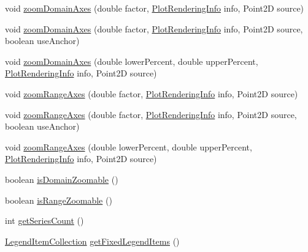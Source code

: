 \begin{DoxyCompactItemize}
\item 
void \mbox{\hyperlink{classorg_1_1jfree_1_1chart_1_1plot_1_1_x_y_plot_ae19a0a54a2ea8a5f86da75f04133eb10}{zoom\+Domain\+Axes}} (double factor, \mbox{\hyperlink{classorg_1_1jfree_1_1chart_1_1plot_1_1_plot_rendering_info}{Plot\+Rendering\+Info}} info, Point2D source)
\item 
void \mbox{\hyperlink{classorg_1_1jfree_1_1chart_1_1plot_1_1_x_y_plot_a68c4a6f62d7e889e17ae696f2e2d24ee}{zoom\+Domain\+Axes}} (double factor, \mbox{\hyperlink{classorg_1_1jfree_1_1chart_1_1plot_1_1_plot_rendering_info}{Plot\+Rendering\+Info}} info, Point2D source, boolean use\+Anchor)
\item 
void \mbox{\hyperlink{classorg_1_1jfree_1_1chart_1_1plot_1_1_x_y_plot_a33fd9493f13695916d80e67997446cdd}{zoom\+Domain\+Axes}} (double lower\+Percent, double upper\+Percent, \mbox{\hyperlink{classorg_1_1jfree_1_1chart_1_1plot_1_1_plot_rendering_info}{Plot\+Rendering\+Info}} info, Point2D source)
\item 
void \mbox{\hyperlink{classorg_1_1jfree_1_1chart_1_1plot_1_1_x_y_plot_abf465c72eede1ebfa6e3f652d2cf3d61}{zoom\+Range\+Axes}} (double factor, \mbox{\hyperlink{classorg_1_1jfree_1_1chart_1_1plot_1_1_plot_rendering_info}{Plot\+Rendering\+Info}} info, Point2D source)
\item 
void \mbox{\hyperlink{classorg_1_1jfree_1_1chart_1_1plot_1_1_x_y_plot_a8d8c5ccab0c266ddad093522ca67a11c}{zoom\+Range\+Axes}} (double factor, \mbox{\hyperlink{classorg_1_1jfree_1_1chart_1_1plot_1_1_plot_rendering_info}{Plot\+Rendering\+Info}} info, Point2D source, boolean use\+Anchor)
\item 
void \mbox{\hyperlink{classorg_1_1jfree_1_1chart_1_1plot_1_1_x_y_plot_ade26392e47e4d08c715c421d5c3c2278}{zoom\+Range\+Axes}} (double lower\+Percent, double upper\+Percent, \mbox{\hyperlink{classorg_1_1jfree_1_1chart_1_1plot_1_1_plot_rendering_info}{Plot\+Rendering\+Info}} info, Point2D source)
\item 
boolean \mbox{\hyperlink{classorg_1_1jfree_1_1chart_1_1plot_1_1_x_y_plot_a5f49e32b31451203cae07ffee7cab4db}{is\+Domain\+Zoomable}} ()
\item 
boolean \mbox{\hyperlink{classorg_1_1jfree_1_1chart_1_1plot_1_1_x_y_plot_a730a3fdcafdb45f7d21112631dec8d28}{is\+Range\+Zoomable}} ()
\item 
int \mbox{\hyperlink{classorg_1_1jfree_1_1chart_1_1plot_1_1_x_y_plot_aa585297f9247a4db3f9eada8935148be}{get\+Series\+Count}} ()
\item 
\mbox{\hyperlink{classorg_1_1jfree_1_1chart_1_1_legend_item_collection}{Legend\+Item\+Collection}} \mbox{\hyperlink{classorg_1_1jfree_1_1chart_1_1plot_1_1_x_y_plot_aef746e72a753b6205a56c53b219cf9c2}{get\+Fixed\+Legend\+Items}} ()

\end{DoxyCompactItemize}
